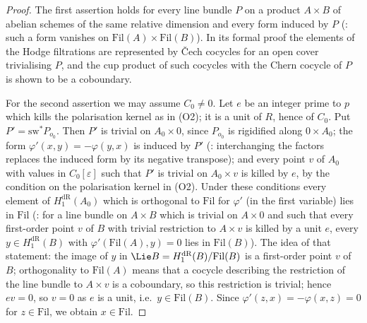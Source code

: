 \begin{proof}
The first assertion holds for every line bundle $P$ on a product $A\times B$ of abelian schemes of the same relative dimension and every form
induced by $P$ (: such a form vanishes on $\mathrm{Fil}(A)\times\mathrm{Fil}(B)$). In its formal
proof the elements of the Hodge filtrations are represented by \v{C}ech cocycles for an open cover trivialising $P$, and the cup product of such
cocycles with the Chern cocycle of $P$ is shown to be a coboundary.

For the second assertion we may assume $C_0\neq0$. Let $e$ be an integer prime to $p$ which kills the polarisation kernel as in (O2); it is a unit
of $R$, hence of $C_0$. Put $P'=\mathrm{sw}^*P_{o_0}$. Then $P'$ is trivial on $A_0\times0$, since $P_{o_0}$ is rigidified along $0\times A_0$; the
form $\varphi'(x,y)=-\varphi(y,x)$ is induced by $P'$ (: interchanging the factors replaces the
induced form by its negative transpose); and every point $v$ of $A_0$ with values in $C_0[\varepsilon]$ such that $P'$ is trivial on $A_0\times v$ is
killed by $e$, by the condition on the polarisation kernel in (O2). Under these conditions every element of $H^{\mathrm{dR}}_1(A_0)$ which is
orthogonal to $\mathrm{Fil}$ for $\varphi'$ (in the first variable) lies in $\mathrm{Fil}$ (: for a
line bundle on $A\times B$ which is trivial on $A\times0$ and such that every first-order point $v$ of $B$ with trivial restriction to $A\times v$
is killed by a unit $e$, every $y\in H^{\mathrm{dR}}_1(B)$ with $\varphi'(\mathrm{Fil}(A),y)=0$ lies in $\mathrm{Fil}(B)$). The idea of that statement:
the image of $y$ in $\Lie B=H^{\mathrm{dR}}_1(B)/\mathrm{Fil}(B)$ is a first-order point $v$ of $B$; orthogonality to $\mathrm{Fil}(A)$ means that a
cocycle describing the restriction of the line bundle to $A\times v$ is a coboundary, so this restriction is trivial; hence $ev=0$, so $v=0$ as
$e$ is a unit, i.e.\ $y\in\mathrm{Fil}(B)$. Since $\varphi'(z,x)=-\varphi(x,z)=0$ for $z\in\mathrm{Fil}$, we obtain $x\in\mathrm{Fil}$.
\end{proof}

